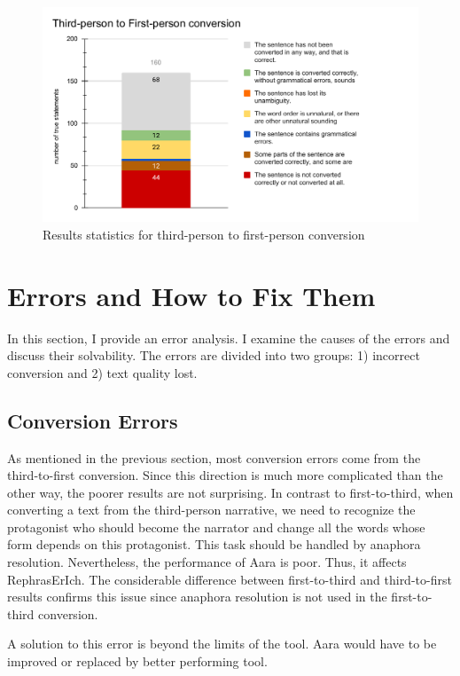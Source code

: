 \begin{figure}[!ht]
\includegraphics[width=\textwidth]{data/Eval-Third-To-First.pdf}
\caption{Results statistics for third-person to first-person conversion}
\label{fig:eval-third-to-first}
\end{figure}

\section{Errors and How to Fix Them} \label{sec:errors}

In this section, I provide an error analysis. I examine the causes of the errors and discuss their solvability. The errors are divided into two groups: 1) incorrect conversion and 2) text quality lost.

\subsection{Conversion Errors}

As mentioned in the previous section, most conversion errors come from the third-to-first conversion. Since this direction is much more complicated than the other way, the poorer results are not surprising. In contrast to first-to-third, when converting a text from the third-person narrative, we need to recognize the protagonist who should become the narrator and change all the words whose form depends on this protagonist. This task should be handled by anaphora resolution. Nevertheless, the performance of Aara is poor. Thus, it affects RephrasErIch. The considerable difference between first-to-third and third-to-first results confirms this issue since anaphora resolution is not used in the first-to-third conversion.

A solution to this error is beyond the limits of the tool. Aara would have to be improved or replaced by better performing tool.


